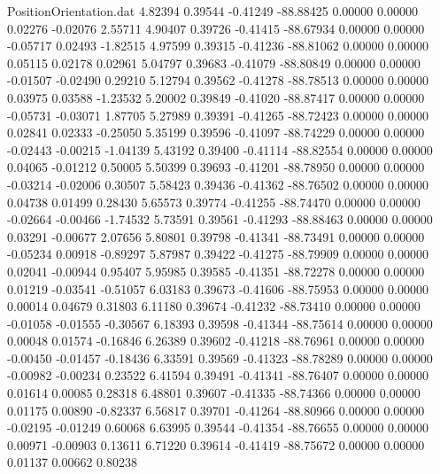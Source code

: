 \begin{filecontents}{PositionOrientation.dat}
   4.82394    0.39544   -0.41249   -88.88425    0.00000    0.00000    0.02276   -0.02076    2.55711
   4.90407    0.39726   -0.41415   -88.67934    0.00000    0.00000   -0.05717    0.02493   -1.82515
   4.97599    0.39315   -0.41236   -88.81062    0.00000    0.00000    0.05115    0.02178    0.02961
   5.04797    0.39683   -0.41079   -88.80849    0.00000    0.00000   -0.01507   -0.02490    0.29210
   5.12794    0.39562   -0.41278   -88.78513    0.00000    0.00000    0.03975    0.03588   -1.23532
   5.20002    0.39849   -0.41020   -88.87417    0.00000    0.00000   -0.05731   -0.03071    1.87705
   5.27989    0.39391   -0.41265   -88.72423    0.00000    0.00000    0.02841    0.02333   -0.25050
   5.35199    0.39596   -0.41097   -88.74229    0.00000    0.00000   -0.02443   -0.00215   -1.04139
   5.43192    0.39400   -0.41114   -88.82554    0.00000    0.00000    0.04065   -0.01212    0.50005
   5.50399    0.39693   -0.41201   -88.78950    0.00000    0.00000   -0.03214   -0.02006    0.30507
   5.58423    0.39436   -0.41362   -88.76502    0.00000    0.00000    0.04738    0.01499    0.28430
   5.65573    0.39774   -0.41255   -88.74470    0.00000    0.00000   -0.02664   -0.00466   -1.74532
   5.73591    0.39561   -0.41293   -88.88463    0.00000    0.00000    0.03291   -0.00677    2.07656
   5.80801    0.39798   -0.41341   -88.73491    0.00000    0.00000   -0.05234    0.00918   -0.89297
   5.87987    0.39422   -0.41275   -88.79909    0.00000    0.00000    0.02041   -0.00944    0.95407
   5.95985    0.39585   -0.41351   -88.72278    0.00000    0.00000    0.01219   -0.03541   -0.51057
   6.03183    0.39673   -0.41606   -88.75953    0.00000    0.00000    0.00014    0.04679    0.31803
   6.11180    0.39674   -0.41232   -88.73410    0.00000    0.00000   -0.01058   -0.01555   -0.30567
   6.18393    0.39598   -0.41344   -88.75614    0.00000    0.00000    0.00048    0.01574   -0.16846
   6.26389    0.39602   -0.41218   -88.76961    0.00000    0.00000   -0.00450   -0.01457   -0.18436
   6.33591    0.39569   -0.41323   -88.78289    0.00000    0.00000   -0.00982   -0.00234    0.23522
   6.41594    0.39491   -0.41341   -88.76407    0.00000    0.00000    0.01614    0.00085    0.28318
   6.48801    0.39607   -0.41335   -88.74366    0.00000    0.00000    0.01175    0.00890   -0.82337
   6.56817    0.39701   -0.41264   -88.80966    0.00000    0.00000   -0.02195   -0.01249    0.60068
   6.63995    0.39544   -0.41354   -88.76655    0.00000    0.00000    0.00971   -0.00903    0.13611
   6.71220    0.39614   -0.41419   -88.75672    0.00000    0.00000    0.01137    0.00662    0.80238

\end{filecontents}
